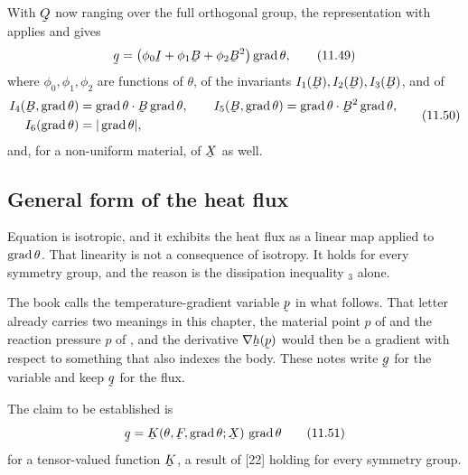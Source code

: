 With $\bQ$ now ranging over the full orthogonal group, the
representation  with  applies and gives
\begin{equation}
   \bq=\big(\phi_{0}\I+\phi_{1}\bB+\phi_{2}\bB^{2}\big)\grad\theta ,
   \tag{11.49}\label{eq:11.49}
\end{equation}
where $\phi_{0},\phi_{1},\phi_{2}$ are functions of $\theta$, of the
invariants $I_{1}(\bB),I_{2}(\bB),I_{3}(\bB)$, and of
\begin{equation}
\begin{aligned}
   I_{4}(\bB,\grad\theta)&=\ip{\grad\theta}{\bB\grad\theta},\qquad
   I_{5}(\bB,\grad\theta)=\ip{\grad\theta}{\bB^{2}\grad\theta},\\
   I_{6}(\grad\theta)&=|\grad\theta| ,
\end{aligned}
   \tag{11.50}\label{eq:11.50}
\end{equation}
and, for a non-uniform material, of $\bX$ as well.

\subsection{General form of the heat flux}\label{sec:ch11heatgen}

Equation  is isotropic, and it exhibits the heat flux as a
linear map applied to $\operatorname{grad}\theta$. That linearity is not a
consequence of isotropy. It holds for every symmetry group, and the
reason is the dissipation inequality $_{3}$ alone.

\begin{remark}\label{rem:ch11gclash}
The book calls the temperature-gradient variable $\bp$ in what follows.
That letter already carries two meanings in this chapter, the material
point $p$ of  and the reaction pressure $p$ of ,
and the derivative $\nabla\bh(\bp)$ would then be a gradient with
respect to something that also indexes the body. These notes write
$\bg$ for the variable and keep $\bq$ for the flux.
\end{remark}

The claim to be established is
\begin{equation}
   \bq=\bK(\theta,\bF,\grad\theta;\bX)\,\grad\theta
   \tag{11.51}\label{eq:11.51}
\end{equation}
for a tensor-valued function $\bK$, a result of [22] holding for every
symmetry group.

